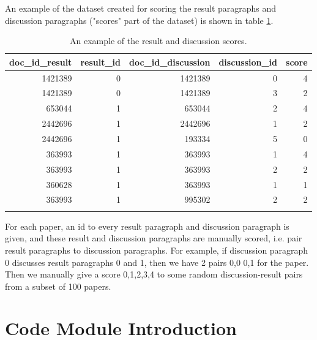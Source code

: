 An example of the dataset created for scoring the result paragraphs and discussion paragraphs ("scores" part of the dataset) is shown in table \ref{tab: result_discussion_score}.

\begin{table}[htbp]
	\centering
	\begin{tabular}{rrrrr}
		\toprule
		\multicolumn{1}{l}{doc\_id\_result} & \multicolumn{1}{l}{result\_id} & \multicolumn{1}{l}{doc\_id\_discussion} & \multicolumn{1}{l}{discussion\_id} & \multicolumn{1}{l}{score} \\
		\midrule
		1421389 & 0     & 1421389 & 0     & 4 \\
		1421389 & 0     & 1421389 & 3     & 2 \\
		653044 & 1     & 653044 & 2     & 4 \\
		2442696 & 1     & 2442696 & 1     & 2 \\
		2442696 & 1     & 193334 & 5     & 0 \\
		363993 & 1     & 363993 & 1     & 4 \\
		363993 & 1     & 363993 & 2     & 2 \\
		360628 & 1     & 363993 & 1     & 1 \\
		363993 & 1     & 995302 & 2     & 2 \\
		\midrule
		&       &       &       &  \\
	\end{tabular}%
	\caption{An example of the result and discussion scores.}
	\label{tab: result_discussion_score}%
\end{table}%

For each paper, an id to every result paragraph and discussion paragraph is given, and these result and discussion paragraphs are manually scored, i.e. pair result paragraphs to discussion paragraphs. 
For example, if discussion paragraph 0 discusses result paragraphs 0 and 1, then we have 2 pairs {0,0} {0,1} for the paper. 
Then we manually give a score {0,1,2,3,4} to some random discussion-result pairs from a subset of 100 papers. 

\section{Code Module Introduction}	%

